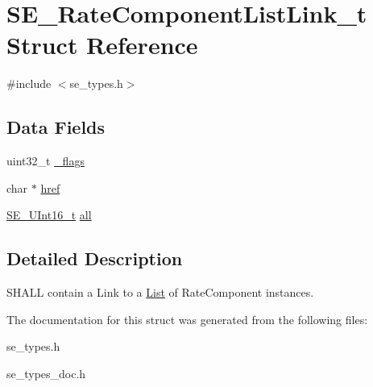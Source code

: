 \hypertarget{structSE__RateComponentListLink__t}{}\section{S\+E\+\_\+\+Rate\+Component\+List\+Link\+\_\+t Struct Reference}
\label{structSE__RateComponentListLink__t}


{\ttfamily \#include $<$se\+\_\+types.\+h$>$}

\subsection*{Data Fields}
\begin{DoxyCompactItemize}
\item 
uint32\+\_\+t \hyperlink{group__RateComponentListLink_gab5a566e23c1feca5b7edf66e81163c59}{\+\_\+flags}
\item 
char $\ast$ \hyperlink{group__RateComponentListLink_ga30ee84ebe24949b38c65f5dba0695720}{href}
\item 
\hyperlink{group__UInt16_gac68d541f189538bfd30cfaa712d20d29}{S\+E\+\_\+\+U\+Int16\+\_\+t} \hyperlink{group__RateComponentListLink_ga2437207ebab9fb065490fd11d4f52902}{all}
\end{DoxyCompactItemize}


\subsection{Detailed Description}
S\+H\+A\+LL contain a Link to a \hyperlink{structList}{List} of Rate\+Component instances. 

The documentation for this struct was generated from the following files\+:\begin{DoxyCompactItemize}
\item 
se\+\_\+types.\+h\item 
se\+\_\+types\+\_\+doc.\+h\end{DoxyCompactItemize}
